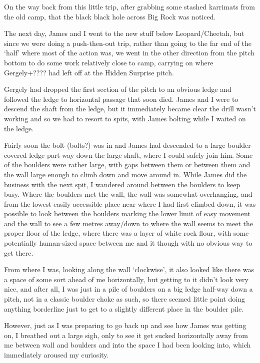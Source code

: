 On the way back from this little trip, after grabbing some stashed
karrimats from the old camp, that the black black hole across Big Rock
was noticed.

The next day, James and I went to the new stuff below Leopard/Cheetah,
but since we were doing a push-then-out trip, rather than going to the
far end of the `half' where most of the action was, we went in the other
direction from the pitch bottom to do some work relatively close to
camp, carrying on where Gergely+???? had left off at the Hidden Surprise
pitch.

Gergely had dropped the first section of the pitch to an obvious ledge
and followed the ledge to horizontal passage that soon died. James and I
were to descend the shaft from the ledge, but it immediately became
clear the drill wasn't working and so we had to resort to spits, with
James bolting while I waited on the ledge.

Fairly soon the bolt (bolts?) was in and James had descended to a large
boulder-covered ledge part-way down the large shaft, where I could
safely join him. Some of the boulders were rather large, with gaps
between them or between them and the wall large enough to climb down and
move around in. While James did the business with the next spit, I
wandered around between the boulders to keep busy. Where the boulders
met the wall, the wall was somewhat overhanging, and from the lowest
easily-accessible place near where I had first climbed down, it was
possible to look between the boulders marking the lower limit of easy
movement and the wall to see a few metres away/down to where the wall
seems to meet the proper floor of the ledge, where there was a layer of
white rock flour, with some potentially human-sized space between me and
it though with no obvious way to get there.

From where I was, looking along the wall `clockwise', it also looked
like there was a space of some sort ahead of me horizontally, but
getting to it didn't look very nice, and after all, I was just in a pile
of boulders on a big ledge half-way down a pitch, not in a classic
boulder choke as such, so there seemed little point doing anything
borderline just to get to a slightly different place in the boulder
pile.

However, just as I was preparing to go back up and see how James was
getting on, I breathed out a large sigh, only to see it get sucked
horizontally away from me between wall and boulders and into the space I
had been looking into, which immediately aroused my curiosity.

